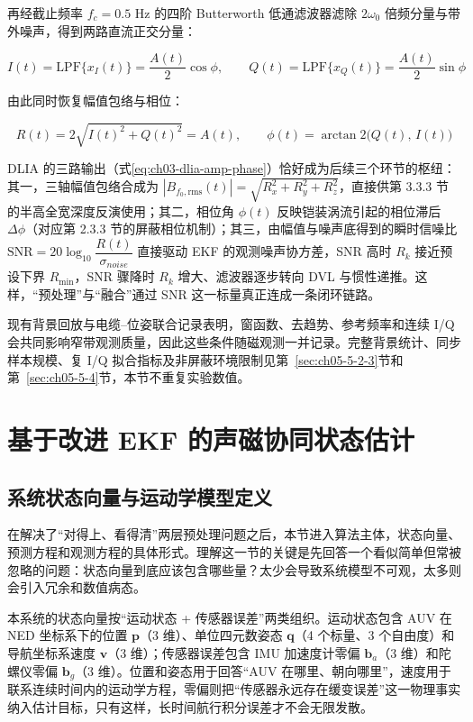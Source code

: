 再经截止频率 \(f_c = 0.5\text{ Hz}\) 的四阶 Butterworth 低通滤波器滤除 \(2\omega_0\) 倍频分量与带外噪声，得到两路直流正交分量：

\begin{equation}
I(t) = \text{LPF}\{x_I(t)\} = \frac{A(t)}{2}\cos\phi, \qquad Q(t) = \text{LPF}\{x_Q(t)\} = \frac{A(t)}{2}\sin\phi
\label{eq:ch03-dlia-iq}
\end{equation}

由此同时恢复幅值包络与相位：

\begin{equation}
R(t) = 2\sqrt{I(t)^2 + Q(t)^2} = A(t), \qquad \phi(t) = \arctan2\big(Q(t),\, I(t)\big)
\label{eq:ch03-dlia-amp-phase}
\end{equation}

DLIA 的三路输出（式\eqref{eq:ch03-dlia-amp-phase}）恰好成为后续三个环节的枢纽：其一，三轴幅值包络合成为 \(|B_{f_0,\mathrm{rms}}(t)| = \sqrt{R_x^2 + R_y^2 + R_z^2}\)，直接供第 3.3.3 节的半高全宽深度反演使用；其二，相位角 \(\phi(t)\) 反映铠装涡流引起的相位滞后 \(\Delta\phi\)（对应第 2.3.3 节的屏蔽相位机制）；其三，由幅值与噪声底得到的瞬时信噪比 \(\text{SNR} = 20\log_{10}\dfrac{R(t)}{\sigma_{noise}}\) 直接驱动 EKF 的观测噪声协方差，SNR 高时 \(R_k\) 接近预设下界 \(R_{\min}\)，SNR 骤降时 \(R_k\) 增大、滤波器逐步转向 DVL 与惯性递推。这样，``预处理''与``融合''通过 SNR 这一标量真正连成一条闭环链路。

现有背景回放与电缆--位姿联合记录表明，窗函数、去趋势、参考频率和连续 I/Q 会共同影响窄带观测质量，因此这些条件随磁观测一并记录。完整背景统计、同步样本规模、复 I/Q 拟合指标及非屏蔽环境限制见第~\ref{sec:ch05-5-2-3}节和第~\ref{sec:ch05-5-4}节，本节不重复实验数值。

\section{基于改进 EKF 的声磁协同状态估计}\label{sec:ch03-3-3}

\subsection{系统状态向量与运动学模型定义}\label{sec:ch03-3-3-1}

在解决了``对得上、看得清''两层预处理问题之后，本节进入算法主体，状态向量、预测方程和观测方程的具体形式。理解这一节的关键是先回答一个看似简单但常被忽略的问题：状态向量到底应该包含哪些量？太少会导致系统模型不可观，太多则会引入冗余和数值病态。

本系统的状态向量按``运动状态 + 传感器误差''两类组织。运动状态包含 AUV 在 NED 坐标系下的位置 \(\boldsymbol{p}\)（3 维）、单位四元数姿态 \(\boldsymbol{q}\)（4 个标量、3 个自由度）和导航坐标系速度 \(\boldsymbol{v}\)（3 维）；传感器误差包含 IMU 加速度计零偏 \(\boldsymbol{b}_a\)（3 维）和陀螺仪零偏 \(\boldsymbol{b}_g\)（3 维）。位置和姿态用于回答``AUV 在哪里、朝向哪里''，速度用于联系连续时间内的运动学方程，零偏则把``传感器永远存在缓变误差''这一物理事实纳入估计目标，只有这样，长时间航行积分误差才不会无限发散。

